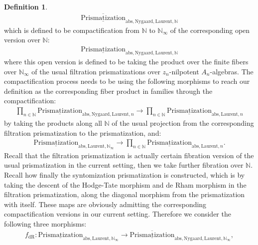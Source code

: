 \documentclass[12pt]{article}
\theoremstyle{definition}
\newtheorem{definition}{Definition}
\begin{document}
\begin{definition}
\begin{align}
\overline{\underline{\mathrm{Prismatization}}}_{\mathrm{abs},\mathrm{Nygaard},\mathrm{Laurent},\mathbb{N}}
\end{align}
which is defined to be compactification from $\mathbb{N}$ to $\mathbb{N}_\infty$ of the corresponding open version over $\mathbb{N}$:
\begin{align}
{\underline{\mathrm{Prismatization}}}_{\mathrm{abs},\mathrm{Nygaard},\mathrm{Laurent},\mathbb{N}}
\end{align}
where this open version is defined to be taking the product over the finite fibers over $\mathbb{N}_\infty$ of the usual filtration prismatizations over $z_n$-nilpotent $A_n$-algebras. The compactification process needs to be using the following morphisms to reach our definition as the corresponding fiber product in families through the compactification:
\begin{align}
\prod_{n\in \mathbb{N}} {\underline{\mathrm{Prismatization}}}_{\mathrm{abs},\mathrm{Nygaard},\mathrm{Laurent},n}\rightarrow  \prod_{n\in \mathbb{N}} {\underline{\mathrm{Prismatization}}}_{\mathrm{abs},\mathrm{Laurent},n}
\end{align}
by taking the products along all $\mathbb{N}$ of the usual projection from the corresponding filtration prismatization to the prismatization, and:
\begin{align}
{\underline{\mathrm{Prismatization}}}_{\mathrm{abs},\mathrm{Laurent},\mathbb{N}_\infty}\rightarrow  \prod_{n\in \mathbb{N}} {\underline{\mathrm{Prismatization}}}_{\mathrm{abs},\mathrm{Laurent},n}.
\end{align}
Recall that the filtration prismatization is actually certain fibration version of the usual prismatization in the current setting, then we take further fibration over $\mathbb{N}$. Recall how finally the syntomization prismatization is constructed, which is by taking the descent of the Hodge-Tate morphism and de Rham morphism in the filtration prismatization, along the diagonal morphism from the prismatization with itself. These maps are obviously admitting the corresponding compactification versions in our current setting. Therefore we consider the following three morphisms:
\begin{align}
f_\mathrm{dR}: {\underline{\mathrm{Prismatization}}}_{\mathrm{abs},\mathrm{Laurent},\mathbb{N}_\infty}\rightarrow \overline{\underline{\mathrm{Prismatization}}}_{\mathrm{abs},\mathrm{Nygaard},\mathrm{Laurent},\mathbb{N}_\infty},
\end{align}

\end{definition}
\end{document}
